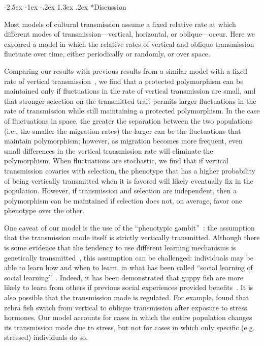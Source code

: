 \documentclass[14pt]{extarticle}
\makeatletter
\renewcommand\section{\@startsection {section}{1}{\z@}%
     {-2.5ex \@plus -1ex \@minus -.2ex}%
     {1.3ex \@plus.2ex}%
    {\Large\bfseries}}
\makeatother
\begin{document}
\section*{Discussion}

Most models of cultural transmission assume a fixed relative rate at which different modes of transmission---vertical, horizontal, or oblique---occur.
Here we explored a model in which the relative rates of vertical and oblique transmission fluctuate over time, either periodically or randomly, or over space.

Comparing our results with previous results from a similar model with a fixed rate of vertical transmission~\citep{Ram2018}, we find that a protected polymorphism can be maintained only if fluctuations in the rate of vertical transmission are small, and that stronger selection on the transmitted trait permits larger fluctuations in the rate of transmission while still maintaining a protected polymorphism. 
In the case of fluctuations in space, the greater the separation between the two populations (i.e., the smaller the migration rates) the larger can be the fluctuations that maintain polymorphism; however, as migration becomes more frequent, even small differences in the vertical transmission rate will eliminate the polymorphism.
When fluctuations are stochastic, we find that if vertical transmission covaries with selection, the phenotype that has a higher probability of being vertically transmitted  when it is favored will likely eventually fix in the population.
However, if transmission and selection are independent, then a polymorphism can be maintained if selection does not, on average, favor one phenotype over the other.

One caveat of our model is the use of the ``phenotypic gambit''~\citep{Grafen1984}: the assumption that the transmission mode itself is strictly vertically transmitted.
Although there is some evidence that the tendency to use different learning mechanisms is genetically transmitted~\citep{Foucaud2013}, this assumption can be challenged: individuals may be able to learn how and when to learn, in what has been called ``social learning of social learning''~\citep{Mesoudi2016}.
Indeed, it has been demonstrated that guppy fish are more likely to learn from others if previous social experiences provided benefits~\citep{Leris2016}.
It is also possible that the transmission mode is regulated.
For example, \citet{Farine2015} found that zebra fish switch from vertical to oblique transmission after exposure to stress hormones.
Our model accounts for cases in which the entire population changes its transmission mode due to stress, but not for cases in which only specific (e.g. stressed) individuals do so.
\end{document}
